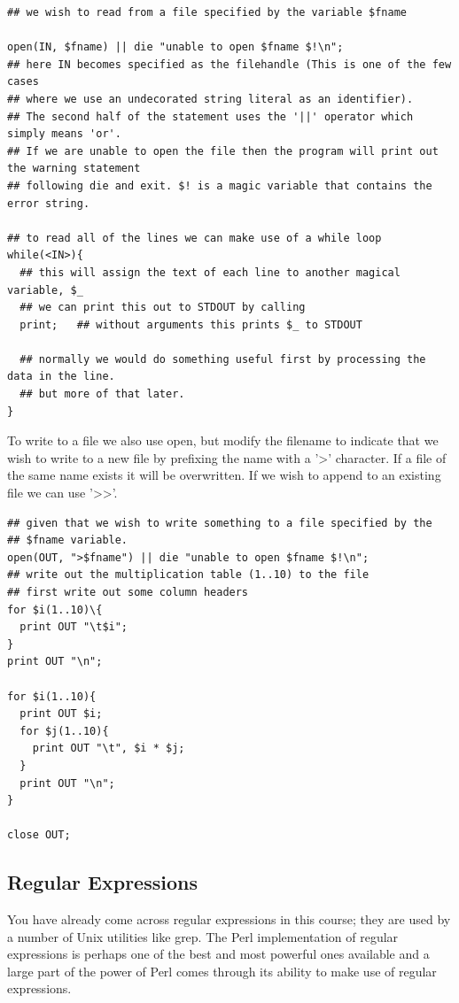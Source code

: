 \documentclass[11pt]{article}
\begin{document}
\begin{verbatim}
## we wish to read from a file specified by the variable $fname

open(IN, $fname) || die "unable to open $fname $!\n";
## here IN becomes specified as the filehandle (This is one of the few cases
## where we use an undecorated string literal as an identifier).
## The second half of the statement uses the '||' operator which simply means 'or'.
## If we are unable to open the file then the program will print out the warning statement
## following die and exit. $! is a magic variable that contains the error string.

## to read all of the lines we can make use of a while loop
while(<IN>){
  ## this will assign the text of each line to another magical variable, $_
  ## we can print this out to STDOUT by calling
  print;   ## without arguments this prints $_ to STDOUT

  ## normally we would do something useful first by processing the data in the line.
  ## but more of that later.
}
\end{verbatim}



To write to a file we also use open, but modify the filename to indicate
that we wish to write to a new file by prefixing the name with a '>'
character. If a file of the same name exists it will be overwritten. If
we wish to append to an existing file we can use '>>'.

\begin{verbatim}
## given that we wish to write something to a file specified by the
## $fname variable.
open(OUT, ">$fname") || die "unable to open $fname $!\n";
## write out the multiplication table (1..10) to the file
## first write out some column headers
for $i(1..10)\{
  print OUT "\t$i";
}
print OUT "\n";

for $i(1..10){
  print OUT $i;
  for $j(1..10){
    print OUT "\t", $i * $j;
  }
  print OUT "\n";
}

close OUT;
\end{verbatim}

\subsection{Regular Expressions}
\label{sec-5-6}

You have already come across regular expressions in this course; they
are used by a number of Unix utilities like grep. The Perl
implementation of regular expressions is perhaps one of the best and
most powerful ones available and a large part of the power of Perl comes
through its ability to make use of regular expressions.
\end{document}
